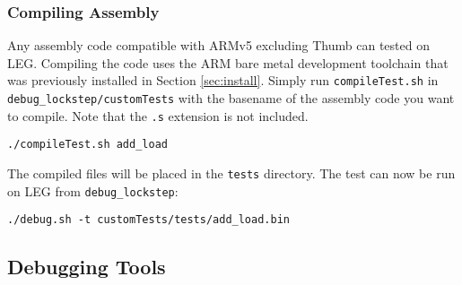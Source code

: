\subsubsection{Compiling Assembly}\label{sec:maketest}
Any assembly code compatible with ARMv5 excluding Thumb can tested on LEG.
Compiling the code uses the ARM bare metal development toolchain that was previously installed in Section \ref{sec:install}.
Simply run \texttt{compileTest.sh} in \texttt{debug\_lockstep/customTests} with the basename of the assembly code you want to compile. Note that the \texttt{.s} extension is not included.

\begin{verbatim}./compileTest.sh add_load\end{verbatim}

The compiled files will be placed in the \texttt{tests} directory. 
The test can now be run on LEG from \texttt{debug\_lockstep}:

\begin{verbatim}./debug.sh -t customTests/tests/add_load.bin\end{verbatim}

\subsection{Debugging Tools}


